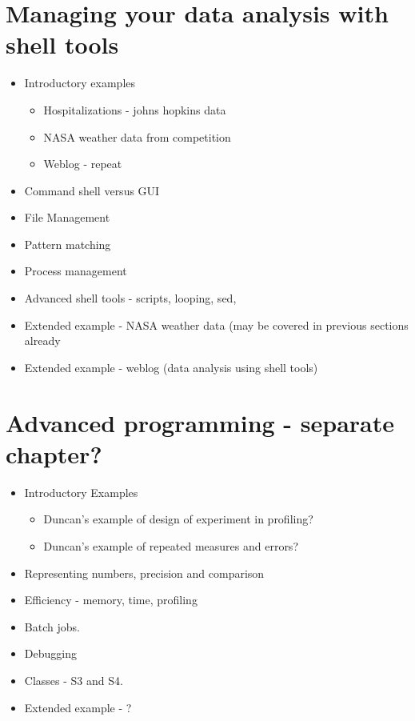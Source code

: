 \documentclass[11pt,timesroman]{article}
\begin{document}
\section{Managing your data analysis with shell tools}
        \begin{itemize}
          \item Introductory examples
            \begin{itemize}
            \item Hospitalizations - johns hopkins data
            \item NASA weather data from competition
            \item Weblog - repeat
            \end{itemize}
          \item Command shell versus GUI
          \item File Management
          \item Pattern matching
          \item Process management
          \item Advanced shell tools - scripts, looping, sed,
          \item Extended example - NASA weather data (may be covered
            in previous sections already
          \item Extended example - weblog (data analysis using shell tools)
          \end{itemize}


\section{Advanced programming - separate chapter?}
        \begin{itemize}
        \item Introductory Examples
          \begin{itemize}
          \item Duncan's example of design of experiment in profiling?
          \item Duncan's example of repeated measures and errors?
          \end{itemize}
        \item Representing numbers, precision and comparison
        \item Efficiency - memory, time, profiling
        \item Batch jobs.
        \item Debugging
        \item Classes - S3 and S4.
        \item Extended example - ?
        \end{itemize}
\end{document}
